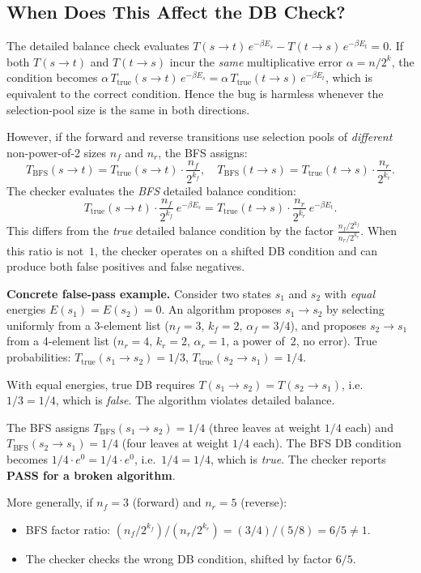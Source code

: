 \documentclass[12pt,a4paper]{article}
\theoremstyle{critical}
\theoremstyle{remark}
\begin{document}
\subsection{When Does This Affect the DB Check?}

The detailed balance check evaluates
$T(s\to t)\,e^{-\beta E_s} - T(t\to s)\,e^{-\beta E_t} = 0$.
If both $T(s\to t)$ and $T(t\to s)$ incur the \emph{same} multiplicative error
$\alpha = n/2^k$, the condition becomes
$\alpha\,T_\text{true}(s\to t)\,e^{-\beta E_s} = \alpha\,T_\text{true}(t\to s)\,e^{-\beta E_t}$,
which is equivalent to the correct condition. Hence the bug is harmless whenever
the selection-pool size is the same in both directions.

However, if the forward and reverse transitions use selection pools of \emph{different}
non-power-of-2 sizes $n_f$ and $n_r$, the BFS assigns:
\[
T_\text{BFS}(s\to t) = T_\text{true}(s\to t)\cdot \frac{n_f}{2^{k_f}}, \quad
T_\text{BFS}(t\to s) = T_\text{true}(t\to s)\cdot \frac{n_r}{2^{k_r}}.
\]
The checker evaluates the \emph{BFS} detailed balance condition:
\[
T_\text{true}(s\to t)\cdot \frac{n_f}{2^{k_f}}\,e^{-\beta E_s}
= T_\text{true}(t\to s)\cdot \frac{n_r}{2^{k_r}}\,e^{-\beta E_t}.
\]
This differs from the \emph{true} detailed balance condition by the factor
$\frac{n_f/2^{k_f}}{n_r/2^{k_r}}$. When this ratio is not~$1$, the checker operates
on a shifted DB condition and can produce both false positives and false negatives.

\textbf{Concrete false-pass example.} Consider two states $s_1$ and $s_2$ with
\emph{equal} energies $E(s_1) = E(s_2) = 0$.  An algorithm proposes
$s_1 \to s_2$ by selecting uniformly from a 3-element list ($n_f = 3$, $k_f = 2$,
$\alpha_f = 3/4$), and proposes $s_2 \to s_1$ from a 4-element list ($n_r = 4$,
$k_r = 2$, $\alpha_r = 1$, a power of~2, no error). True probabilities:
$T_\text{true}(s_1 \to s_2) = 1/3$, $T_\text{true}(s_2 \to s_1) = 1/4$.

With equal energies, true DB requires $T(s_1\to s_2) = T(s_2\to s_1)$,
i.e.\ $1/3 = 1/4$, which is \emph{false}. The algorithm violates detailed balance.

The BFS assigns $T_\text{BFS}(s_1\to s_2) = 1/4$ (three leaves at weight $1/4$ each)
and $T_\text{BFS}(s_2\to s_1) = 1/4$ (four leaves at weight $1/4$ each). The BFS
DB condition becomes $1/4 \cdot e^{0} = 1/4 \cdot e^{0}$, i.e.\ $1/4 = 1/4$, which
is \emph{true}. The checker reports \textbf{PASS for a broken algorithm}.

More generally, if $n_f = 3$ (forward) and $n_r = 5$ (reverse):
\begin{itemize}
\item BFS factor ratio: $(n_f/2^{k_f}) / (n_r/2^{k_r}) = (3/4)/(5/8) = 6/5 \neq 1$.
\item The checker checks the wrong DB condition, shifted by factor $6/5$.
\end{itemize}
\end{document}

